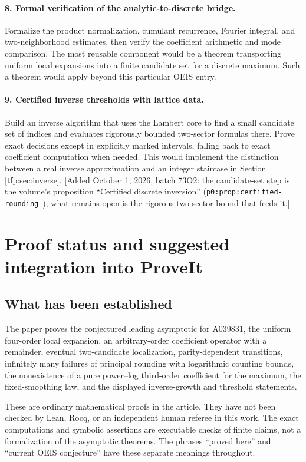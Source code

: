 \documentclass[11pt,a4paper]{article}
\numberwithin{equation}{section}
\theoremstyle{definition}\newtheorem{definition}[theorem]{Definition}
\theoremstyle{remark}\newtheorem{remark}[theorem]{Remark}
\begin{document}
\paragraph{8. Formal verification of the analytic-to-discrete bridge.}
Formalize the product normalization, cumulant recurrence, Fourier
integral, and two-neighborhood estimates, then verify the coefficient
arithmetic and mode comparison. The most reusable component would be
a theorem transporting uniform local expansions into a finite
candidate set for a discrete maximum. Such a theorem would apply
beyond this particular OEIS entry.

\paragraph{9. Certified inverse thresholds with lattice data.}
Build an inverse algorithm that uses the Lambert core to find a small
candidate set of indices and evaluates rigorously bounded two-sector
formulas there. Prove exact decisions except in explicitly marked
intervals, falling back to exact coefficient computation when needed.
This would implement the distinction between a real inverse
approximation and an integer staircase in Section \ref{tfp:sec:inverse}.
[Added October 1, 2026, batch 73O2: the candidate-set step is the volume's
proposition ``Certified discrete inversion''
(\texttt{p0:prop:certified-rounding}~\cite{tai}); what remains open is the
rigorous two-sector bound that feeds it.]

\section{Proof status and suggested integration into ProveIt}
\subsection{What has been established}
The paper proves the conjectured leading asymptotic for A039831, the
uniform four-order local expansion, an arbitrary-order coefficient
operator with a remainder, eventual two-candidate localization,
parity-dependent transitions, infinitely many failures of principal
rounding with logarithmic counting bounds, the nonexistence of a pure
power--log third-order coefficient for the maximum, the fixed-smoothing
law, and the displayed inverse-growth and threshold statements.

These are ordinary mathematical proofs in the article. They have not
been checked by Lean, Rocq, or an independent human referee in this
work. The exact computations and symbolic assertions are executable
checks of finite claims, not a formalization of the asymptotic theorems.
The phrases ``proved here'' and ``current OEIS conjecture'' have these
separate meanings throughout.
\end{document}
